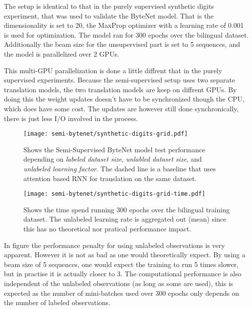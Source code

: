The setup is identical to that in the purely supervised synthetic digits experiment, that was used to validate the ByteNet model. That is the dimensionality is set to 20, the MaxProp optimizer with a learning rate of 0.001 is used for optimization. The model ran for 300 epochs over the bilingual dataset. Additionally the beam size for the unsupervised part is set to 5 sequences, and the model is parallelized over 2 GPUs.

This multi-GPU parallelization is done a little diffrent that in the purely supervised experiments. Because the semi-supervised setup uses two separate translation models, the two translation models are keep on diffrent GPUs. By doing this the weight updates doesn't have to be synchronized though the CPU, which does have some cost. The updates are however still done synchronically, there is just less I/O involved in the process.

\begin{figure}[h]
    \centering
    \texttt{[image: semi-bytenet/synthetic-digits-grid.pdf]}
    \caption{Shows the Semi-Supervised ByteNet model test performance depending on \textit{labeled dataset size}, \textit{unlabled dataset size}, and \textit{unlabeled learning factor}. The dashed line is a baseline that uses attention based RNN for translation on the same dataset.}
     \label{fig:result:semi-bytenet:missrate}
\end{figure}

\begin{figure}[h]
    \centering
    \texttt{[image: semi-bytenet/synthetic-digits-grid-time.pdf]}
    \caption{Shows the time spend running 300 epochs over the bilingual training dataset. The unlabeled learning rate is aggregated out (mean) since this has no theoretical nor pratical performance impact.}
    \label{fig:result:semi-bytenet:time}
\end{figure}

In figure \label{fig:result:semi-bytenet:time} the performance penalty for using unlabeled observations is very apparent. However it is not as bad as one would theoretically expect. By using a beam size of 5 sequences, one would expect the training to run 5 times slower, but in practise it is actually closer to 3. The computational performance is also independent of the unlabeled observations (as long as some are used), this is expected as the number of mini-batches used over 300 epochs only depends on the number of labeled observations.

